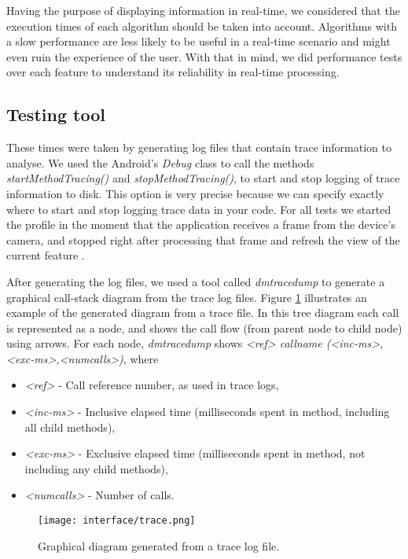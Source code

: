 Having the purpose of displaying information in real-time, we considered that the execution times of each algorithm should be taken into account. Algorithms with a slow performance are less likely to be useful in a real-time scenario and might even ruin the experience of the user. With that in mind, we did performance tests over each feature to understand its reliability in real-time processing.


\subsection{Testing tool}
These times were taken by generating log files that contain trace information to analyse. We used the Android's \emph{Debug} class to call the methods \emph{startMethodTracing()} and \emph{stopMethodTracing()}, to start and stop logging of trace information to disk. This option is very precise because we can specify exactly where to start and stop logging trace data in your code. For all tests we started the profile in the moment that the application receives a frame from the device's camera, and stopped right after processing that frame and refresh the view of the current feature \cite{SDK}.

After generating the log files, we used a tool called \emph{dmtracedump} to generate a graphical call-stack diagram from the trace log files. Figure \ref{fig:trace_ex} illustrates an example of the generated diagram from a trace file. 
In this tree diagram each call is represented as a node, and shows the call flow (from parent node to child node) using arrows. For each node, \emph{dmtracedump} shows \emph{<ref> callname (<inc-ms>, <exc-ms>,<numcalls>)}, where

\begin{itemize}
\item \emph{<ref>} - Call reference number, as used in trace logs,
\item \emph{<inc-ms>} - Inclusive elapsed time (milliseconds spent in method, including all child methods),
\item \emph{<exc-ms>} - Exclusive elapsed time (milliseconds spent in method, not including any child methods),
\item \emph{<numcalls>} - Number of calls.
\end{itemize}

\begin{figure}[htb]
	\centering
	\texttt{[image: interface/trace.png]}
	\caption{Graphical diagram generated from a trace log file.}
	\label{fig:trace_ex}
\end{figure}

